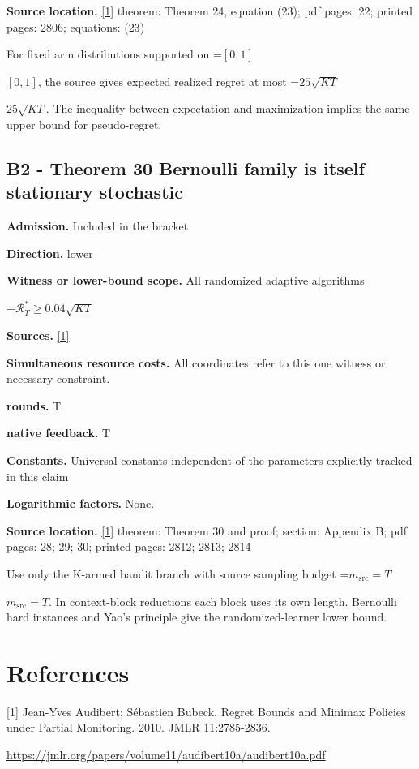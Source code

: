 \documentclass[10pt,a4paper]{article}
\newcommand{\AtlasMath}[1]{\par\begingroup\centering\setbox0=\hbox{$\displaystyle #1$}\ifdim\wd0>1.4\linewidth\typeout{ATLAS WIDE FORMULA: \the\wd0}\fi\ifdim\wd0>\linewidth\resizebox{\linewidth}{!}{\box0}\else\box0\fi\par\endgroup}
\newcommand{\AtlasInlineMath}[1]{\begingroup\setbox0=\hbox{$#1$}\ifdim\wd0>.4\linewidth\endgroup\AtlasMath{#1}\else\endgroup$#1$\fi}
\begin{document}
\textbf{Source location.} \href{https://jmlr.org/papers/volume11/audibert10a/audibert10a.pdf}{[1]} theorem: Theorem 24, equation (23); pdf pages: 22; printed pages: 2806; equations: (23)

For fixed arm distributions supported on \AtlasInlineMath{[0,1]}, the source gives expected realized regret at most \AtlasInlineMath{25\sqrt{KT}}. The inequality between expectation and maximization implies the same upper bound for pseudo-regret.

\subsection{B2 - Theorem 30 Bernoulli family is itself stationary stochastic}
\textbf{Admission.} Included in the bracket

\textbf{Direction.} lower

\textbf{Witness or lower-bound scope.} All randomized adaptive algorithms

\AtlasMath{\mathcal{R}_T^*\ge0.04\sqrt{KT}}
\textbf{Sources.} \href{https://jmlr.org/papers/volume11/audibert10a/audibert10a.pdf}{[1]}

\textbf{Simultaneous resource costs.} All coordinates refer to this one witness or necessary constraint.

\textbf{rounds.} T

\textbf{native feedback.} T

\textbf{Constants.} Universal constants independent of the parameters explicitly tracked in this claim

\textbf{Logarithmic factors.} None.

\textbf{Source location.} \href{https://jmlr.org/papers/volume11/audibert10a/audibert10a.pdf}{[1]} theorem: Theorem 30 and proof; section: Appendix B; pdf pages: 28; 29; 30; printed pages: 2812; 2813; 2814

Use only the K-armed bandit branch with source sampling budget \AtlasInlineMath{m_{\mathrm{src}}=T}. In context-block reductions each block uses its own length. Bernoulli hard instances and Yao's principle give the randomized-learner lower bound.

\section{References}
[1] Jean-Yves Audibert; Sébastien Bubeck. Regret Bounds and Minimax Policies under Partial Monitoring. 2010. JMLR 11:2785-2836.

\url{https://jmlr.org/papers/volume11/audibert10a/audibert10a.pdf}
\end{document}

